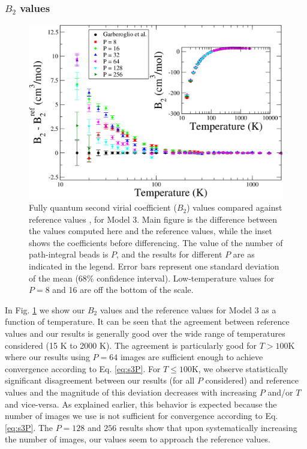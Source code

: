             \subsubsection{$B_2$ values}
                \begin{figure}[!htbp]
                    \centering
                    \includegraphics[scale=0.20,keepaspectratio]{Chapter-4/Figures/s3GarberoglioAll.png}
                    \caption{Fully quantum second virial coefficient ($B_2$) values compared against reference values \cite{Garberoglio2014}, for Model 3. Main figure is the difference between the values computed here and the reference values, while the inset shows the coefficients before differencing. The value of the number of path-integral beads is $P$, and the results for different $P$ are as indicated in the legend. Error bars represent one standard deviation of the mean (68\% confidence interval). Low-temperature values for $P = 8$ and 16 are off the bottom of the scale.}
                    \label{fig:variable}
                \end{figure}

                In Fig. \ref{fig:variable} we show our $B_2$ values and the reference values for Model 3 as a function of temperature. It can be seen that the agreement between reference values and our results is generally good over the wide range of temperatures considered (15 K to 2000 K). The agreement is particularly good for $T > 100 $K where our results using $P = 64$ images are sufficient enough to achieve convergence according to Eq. \eqref{eq:s3P}. For $T \le 100 $K, we observe statistically significant disagreement between our results (for all $P$ considered) and reference values and the magnitude of this deviation decreases with increasing $P$ and/or $T$ and vice-versa. As explained earlier, this behavior is expected because the number of images we use is not sufficient for convergence according to Eq. \eqref{eq:s3P}. The $P = 128$ and $256$ results show that upon systematically increasing the number of images, our values seem to approach the reference values.

